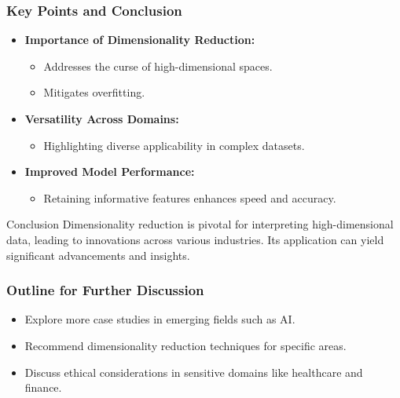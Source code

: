 \documentclass[aspectratio=169]{beamer}
\begin{document}
\begin{frame}[fragile]
    \frametitle{Key Points and Conclusion}
    \begin{itemize}
        \item \textbf{Importance of Dimensionality Reduction:}
            \begin{itemize}
                \item Addresses the curse of high-dimensional spaces.
                \item Mitigates overfitting.
            \end{itemize}
        \item \textbf{Versatility Across Domains:} 
            \begin{itemize}
                \item Highlighting diverse applicability in complex datasets.
            \end{itemize}
        \item \textbf{Improved Model Performance:} 
            \begin{itemize}
                \item Retaining informative features enhances speed and accuracy.
            \end{itemize}
    \end{itemize}
    \begin{block}{Conclusion}
        Dimensionality reduction is pivotal for interpreting high-dimensional data, leading to innovations across various industries. Its application can yield significant advancements and insights.
    \end{block}
\end{frame}

\begin{frame}[fragile]
    \frametitle{Outline for Further Discussion}
    \begin{itemize}
        \item Explore more case studies in emerging fields such as AI.
        \item Recommend dimensionality reduction techniques for specific areas.
        \item Discuss ethical considerations in sensitive domains like healthcare and finance.
    \end{itemize}
\end{frame}
\end{document}
